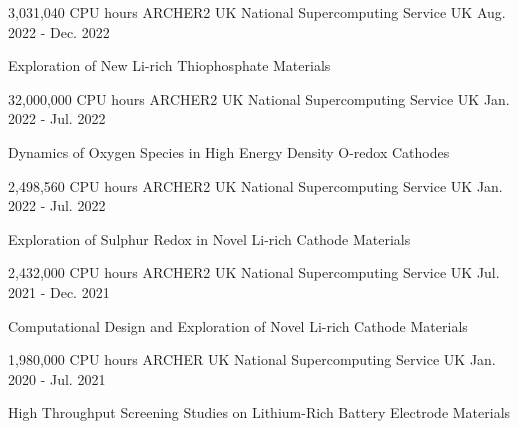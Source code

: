 
\begin{cventries}

    \cventry
    {3,031,040 CPU hours} %
    {ARCHER2 UK National Supercomputing Service} %
    {UK} %
    {Aug. 2022 - Dec. 2022} %
    {
      \begin{cvitems} %
        \item {Exploration of New Li-rich Thiophosphate Materials}
      \end{cvitems}
    }
    \cventry
    {32,000,000 CPU hours} %
    {ARCHER2 UK National Supercomputing Service} %
    {UK} %
    {Jan. 2022 - Jul. 2022} %
    {
      \begin{cvitems} %
        \item {Dynamics of Oxygen Species in High Energy Density O-redox Cathodes}
      \end{cvitems}
    }
    \cventry
    {2,498,560 CPU hours} %
    {ARCHER2 UK National Supercomputing Service} %
    {UK} %
    {Jan. 2022 - Jul. 2022} %
    {
      \begin{cvitems} %
        \item {Exploration of Sulphur Redox in Novel Li-rich Cathode Materials}
      \end{cvitems}
    }
    \cventry
    {2,432,000 CPU hours} %
    {ARCHER2 UK National Supercomputing Service} %
    {UK} %
    {Jul. 2021 - Dec. 2021} %
    {
      \begin{cvitems} %
        \item {Computational Design and Exploration of Novel Li-rich Cathode Materials}
      \end{cvitems}
    }
    \cventry
    {1,980,000 CPU hours} %
    {ARCHER UK National Supercomputing Service} %
    {UK} %
    {Jan. 2020 - Jul. 2021} %
    {
      \begin{cvitems} %
        \item {High Throughput Screening Studies on Lithium-Rich Battery
Electrode Materials}
      \end{cvitems}
    }
\end{cventries}
